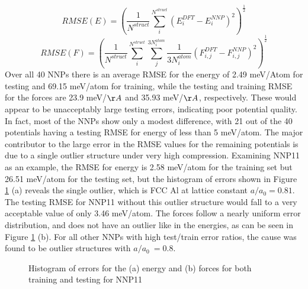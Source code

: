 \documentclass{article}
\begin{document}
\begin{equation}
    RMSE(E) = (\frac{1}{N^{struct}}\sum_i^{N^{struct}} (E^{DFT}_i - E^{NNP}_i)^2)^\frac{1}{2}
\end{equation}
\begin{equation}
        RMSE(F) = (\frac{1}{N^{struct}}\sum_i^{N^{struct}}\sum_j^{3N^{atom}_i}\frac{1}{3N^{atom}_i} (F^{DFT}_{i,j} - F^{NNP}_{i,j})^2)^\frac{1}{2}
\end{equation}
Over all 40 NNPs there is an average RMSE for the energy of 2.49 meV/Atom for testing and 69.15 meV/atom for training, while the testing and training RMSE for the forces are 23.9 meV/$\AA$ and 35.93 meV/$\AA$, respectively.  These would appear to be unacceptably large testing errors, indicating poor potential quality.  In fact, most of the NNPs show only a modest difference, with 21 out of the 40 potentials having a testing RMSE for energy of less than 5 meV/atom.  The major contributor to the large error in the RMSE values for the remaining potentials is due to a single outlier structure under very high compression.  Examining NNP11 as an example, the  RMSE for energy is 2.58 meV/atom for the training set but 26.51 meV/atom for the testing set, but the histogram of errors shown in Figure \ref{fig:rmse_histogram} (a) reveals the single outlier, which is FCC Al at lattice constant $a/a_0 =0.81$.   The testing RMSE for NNP11 without this outlier structure would fall to a very acceptable value of only 3.46 meV/atom. The forces follow a nearly uniform error distribution, and does not have an outlier like in the energies, as can be seen in Figure \ref{fig:rmse_histogram} (b).  
For all other NNPs with high test/train error ratios, the cause was found to be outlier structures with $a/a_0 ~= 0.8$. 

\begin{figure}[H]%
\centering%
%
%
\caption{Histogram of errors for the (a) energy and  (b) forces for both training and testing for NNP11}
\label{fig:rmse_histogram}
\end{figure}
\end{document}
